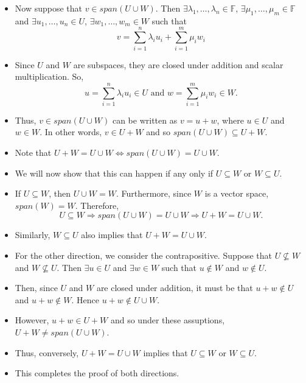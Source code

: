 \documentclass{article}
\begin{document}
\begin{itemize}
\begin{itemize}
\begin{itemize}
            \[
            U+W \subseteq span(U \cup W).
            \]
            \item Now suppose that $v \in span(U \cup W)$. Then $\exists \lambda_1,\dots,\lambda_n \in \mathbb{F}$, $\exists \mu_1,\dots,\mu_m \in \mathbb{F}$ and $\exists u_1,\dots,u_n \in U$, $\exists w_1,\dots,w_m \in W$ such that
            \[
            v = \sum_{i=1}^n \lambda_i u_i + \sum_{i=1}^m \mu_i w_i
            \]
            \item Since $U$ and $W$ are subspaces, they are closed under addition and scalar multiplication. So,
            \[
            u = \sum_{i=1}^n \lambda_i u_i \in U \text{ and } w = \sum_{i=1}^m \mu_i w_i \in W.
            \]
            \item Thus, $v \in span(U \cup W)$ can be written as $v = u+w$, where $u \in U$ and $w \in W$. In other words, $v \in U+W$ and so $span(U \cup W) \subseteq U+W$.
            \item Note that $U+W = U \cup W \Longleftrightarrow span(U \cup W) = U \cup W$.
            \item We will now show that this can happen if any only if $U \subseteq W$ or $W \subseteq U$.
            \item If $U \subseteq W$, then $U \cup W = W$. Furthermore, since $W$ is a vector space, $span(W)=W$. Therefore,
            \[
            U \subseteq W \Rightarrow span(U \cup W) = U \cup W \Rightarrow U+W = U \cup W.
            \]
            \item Similarly, $W \subseteq U$ also implies that $U+W = U \cup W$.
            \item For the other direction, we consider the contrapositive. Suppose that $U \nsubseteq W$ and $W \nsubseteq U$. Then $\exists u \in U$ and $\exists w \in W$ such that $u \notin W$ and $w \notin U$.
            \item Then, since $U$ and $W$ are closed under addition, it must be that $u+w \notin U$ and $u+w \notin W$. Hence $u+w \notin U \cup W$.
            \item However, $u+w \in U + W$ and so under these assuptions, $U+W \neq span(U \cup W)$.
            \item Thus, conversely, $U+W = U \cup W$ implies that $U \subseteq W$ or $W \subseteq U$.
            \item This completes the proof of both directions.
        \end{itemize}
    \end{itemize}
\end{itemize}
\end{document}
